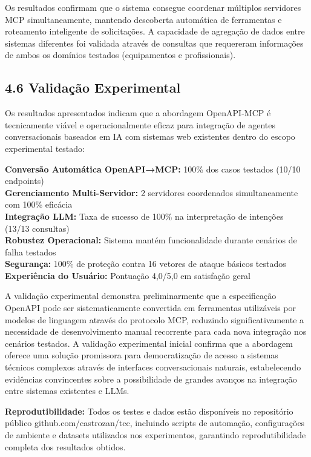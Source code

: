 \documentclass[
]{article}
\begin{document}
Os resultados confirmam que o sistema consegue coordenar múltiplos
servidores MCP simultaneamente, mantendo descoberta automática de
ferramentas e roteamento inteligente de solicitações. A capacidade de
agregação de dados entre sistemas diferentes foi validada através de
consultas que requereram informações de ambos os domínios testados
(equipamentos e profissionais).

\subsection{4.6 Validação
Experimental}\label{validauxe7uxe3o-experimental}

Os resultados apresentados indicam que a abordagem OpenAPI-MCP é
tecnicamente viável e operacionalmente eficaz para integração de agentes
conversacionais baseados em IA com sistemas web existentes dentro do
escopo experimental testado:

\textbf{Conversão Automática OpenAPI→MCP:} 100\% dos casos testados
(10/10 endpoints)\\
\textbf{Gerenciamento Multi-Servidor:} 2 servidores coordenados
simultaneamente com 100\% eficácia\\
\textbf{Integração LLM:} Taxa de sucesso de 100\% na interpretação de
intenções (13/13 consultas)\\
\textbf{Robustez Operacional:} Sistema mantém funcionalidade durante
cenários de falha testados\\
\textbf{Segurança:} 100\% de proteção contra 16 vetores de ataque
básicos testados\\
\textbf{Experiência do Usuário:} Pontuação 4,0/5,0 em satisfação geral

A validação experimental demonstra preliminarmente que a especificação
OpenAPI pode ser sistematicamente convertida em ferramentas utilizáveis
por modelos de linguagem através do protocolo MCP, reduzindo
significativamente a necessidade de desenvolvimento manual recorrente
para cada nova integração nos cenários testados. A validação
experimental inicial confirma que a abordagem oferece uma solução
promissora para democratização de acesso a sistemas técnicos complexos
através de interfaces conversacionais naturais, estabelecendo evidências
convincentes sobre a possibilidade de grandes avanços na integração
entre sistemas existentes e LLMs.

\textbf{Reprodutibilidade:} Todos os testes e dados estão disponíveis no
repositório público github.com/castrozan/tcc, incluindo scripts de
automação, configurações de ambiente e datasets utilizados nos
experimentos, garantindo reprodutibilidade completa dos resultados
obtidos.
\end{document}

